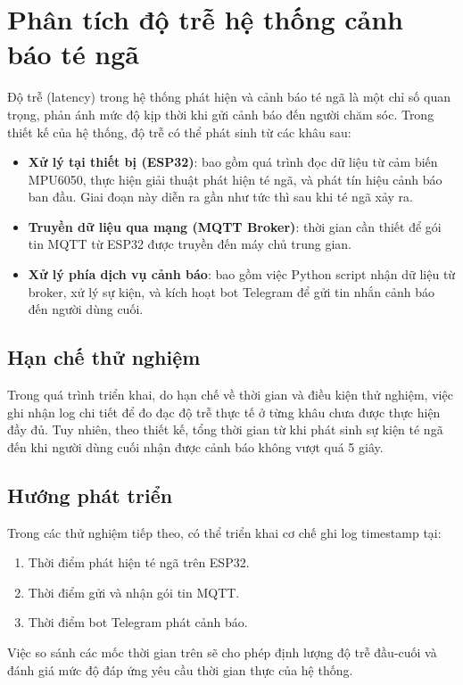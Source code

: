 
\section{Phân tích độ trễ hệ thống cảnh báo té ngã}
\label{sec:latency_analysis}

Độ trễ (latency) trong hệ thống phát hiện và cảnh báo té ngã là một chỉ số quan trọng, phản ánh mức độ kịp thời khi gửi cảnh báo đến người chăm sóc. Trong thiết kế của hệ thống, độ trễ có thể phát sinh từ các khâu sau:

\begin{itemize}
    \item \textbf{Xử lý tại thiết bị (ESP32)}: bao gồm quá trình đọc dữ liệu từ cảm biến MPU6050, thực hiện giải thuật phát hiện té ngã, và phát tín hiệu cảnh báo ban đầu. Giai đoạn này diễn ra gần như tức thì sau khi té ngã xảy ra.
    \item \textbf{Truyền dữ liệu qua mạng (MQTT Broker)}: thời gian cần thiết để gói tin MQTT từ ESP32 được truyền đến máy chủ trung gian.
    \item \textbf{Xử lý phía dịch vụ cảnh báo}: bao gồm việc Python script nhận dữ liệu từ broker, xử lý sự kiện, và kích hoạt bot Telegram để gửi tin nhắn cảnh báo đến người dùng cuối.
\end{itemize}

\subsection*{Hạn chế thử nghiệm}
Trong quá trình triển khai, do hạn chế về thời gian và điều kiện thử nghiệm, việc ghi nhận log chi tiết để đo đạc độ trễ thực tế ở từng khâu chưa được thực hiện đầy đủ. Tuy nhiên, theo thiết kế, tổng thời gian từ khi phát sinh sự kiện té ngã đến khi người dùng cuối nhận được cảnh báo không vượt quá 5 giây.

\subsection*{Hướng phát triển}
Trong các thử nghiệm tiếp theo, có thể triển khai cơ chế ghi log timestamp tại:
\begin{enumerate}
    \item Thời điểm phát hiện té ngã trên ESP32.
    \item Thời điểm gửi và nhận gói tin MQTT.
    \item Thời điểm bot Telegram phát cảnh báo.
\end{enumerate}

Việc so sánh các mốc thời gian trên sẽ cho phép định lượng độ trễ đầu-cuối và đánh giá mức độ đáp ứng yêu cầu thời gian thực của hệ thống.
